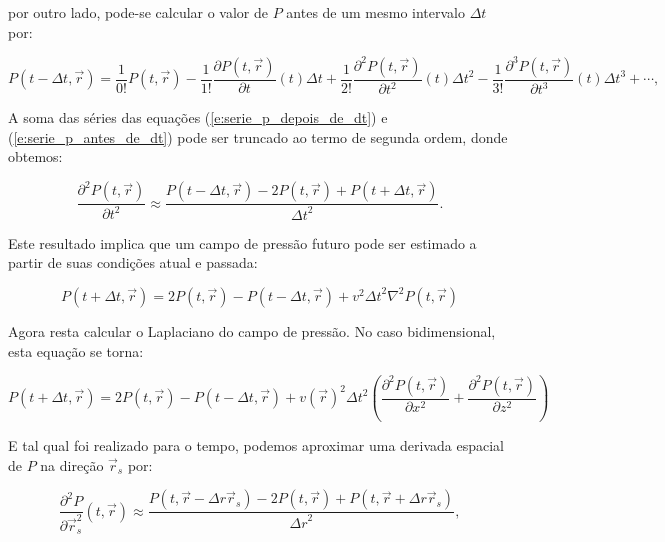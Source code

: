     \noindent por outro lado, pode-se calcular o valor de $P$ antes de um mesmo intervalo $\Delta t$ por:

    \begin{equation} \label{e:serie_p_antes_de_dt}
      P(t-{\Delta t}, \vec{r}) =
        \frac{1}{0!} P(t, \vec{r})
        - \frac{1}{1!} \frac{\partial P(t, \vec{r})}{\partial t}(t) {\Delta t}
        + \frac{1}{2!} \frac{\partial^2 P(t, \vec{r})}{\partial t^2}(t) {\Delta t}^2
        - \frac{1}{3!} \frac{\partial^3 P(t, \vec{r})}{\partial t^3}(t) {\Delta t}^3
        + \cdots
        ,
    \end{equation}

    A soma das séries das equações (\ref{e:serie_p_depois_de_dt}) e (\ref{e:serie_p_antes_de_dt}) pode ser truncado ao termo de segunda ordem, donde obtemos:

    \begin{equation} \label{e:fdm_t}
      \frac{\partial^2 P(t, \vec{r})}{\partial t^2} \approx
      \frac{P(t-{\Delta t}, \vec{r}) - 2P(t, \vec{r}) + P(t+{\Delta t}, \vec{r})}{{\Delta t}^2}
      .
    \end{equation}

    Este resultado implica que um campo de pressão futuro pode ser estimado a partir de suas condições atual e passada:

    \begin{equation} \label{e:fdm_tempo_apenas}
      P(t+\Delta t, \vec{r}) = 2 P(t, \vec{r}) - P(t-\Delta t, \vec{r}) + v^2 {\Delta t}^2 \nabla^2 P(t, \vec{r})
    \end{equation}

    Agora resta calcular o Laplaciano do campo de pressão. No caso bidimensional, esta equação se torna:

    \begin{equation} \label{e:fdm_2d}
      P(t+\Delta t, \vec{r}) = 2 P(t, \vec{r}) - P(t-\Delta t, \vec{r}) + v(\vec{r})^2 {\Delta t}^2 \left(\frac{\partial^2 P(t, \vec{r})}{\partial x^2} +\frac{\partial^2 P(t, \vec{r})}{\partial z^2} \right)
    \end{equation}

    E tal qual foi realizado para o tempo, podemos aproximar uma derivada espacial de $P$ na direção $\vec{r}_s$ por:

    \begin{equation} \label{e:fdm_h}
      \frac{\partial^2 P}{\partial\vec{r}_s^2} (t, \vec{r}) \approx
      \frac{P(t,\vec{r}-{\Delta r}\vec{r}_s) - 2P(t,\vec{r}) + P(t,\vec{r}+{\Delta r}\vec{r}_s)}{{\Delta r}^2}
      ,
    \end{equation}

